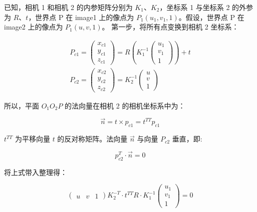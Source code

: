 \documentclass[cn,10pt,math=newtx,citestyle=gb7714-2015,bibstyle=gb7714-2015]{elegantbook}
\begin{document}
已知，相机 1 和相机 2 的内参矩阵分别为 $K_1$、$K_2$，坐标系 1 与坐标系 2 的外参为 $R$、$t$，世界点 P 在 image1 上的像点为 $P_1(u_1,v_1,1)$。假设，世界点 P 在 image2 上的像点为 $P_1(u,v,1)$。 第一步，将所有点变换到相机 2 坐标系：


\begin{equation}
\begin{gathered}
P_{c 1}=\left(\begin{array}{l}
x_{c 1} \\
y_{c 1} \\
z_{c 1}
\end{array}\right)=R(K_{1}^{-1}\left(\begin{array}{c}
u_{1} \\
v_{1} \\
1
\end{array}\right))+t \\
P_{c 2}=\left(\begin{array}{l}
x_{c 2} \\
y_{c 2} \\
z_{c 2}
\end{array}\right)=K_{2}^{-1}\left(\begin{array}{c}
u \\
v \\
1
\end{array}\right)
\end{gathered}
\end{equation}


所以，平面 $O_1O_2P$ 的法向量在相机 2 的相机坐标系中为：


\begin{equation}
\vec{n}=t \times p_{c 1}=t^{T T} p_{c 1}
\end{equation}


$t^{TT}$ 为平移向量 $t$ 的反对称矩阵。法向量 $\vec{n}$ 与向量 $P_{c2}$ 垂直，即:


\begin{equation}
p_{c 2}^{T} \cdot \vec{n}=0
\end{equation}


将上式带入整理得：


\begin{equation}
\left(\begin{array}{lll}
u & v & 1
\end{array}\right) K_{2}^{-T} \cdot t^{T T} R \cdot K_{1}^{-1}\left(\begin{array}{c}
u_{1} \\
v_{1} \\
1
\end{array}\right)=0
\end{equation}
\end{document}
